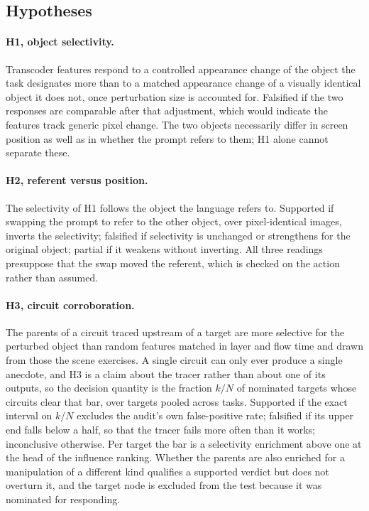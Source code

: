 \subsection{Hypotheses}
\label{sec:hypotheses}

\paragraph{H1, object selectivity.}
Transcoder features respond to a controlled appearance change of the object
the task designates more than to a matched appearance change of a visually
identical object it does not, once perturbation size is accounted for.
Falsified if the two responses are comparable after that adjustment, which
would indicate the features track generic pixel change. The two objects
necessarily differ in screen position as well as in whether the prompt refers
to them; H1 alone cannot separate these.

\paragraph{H2, referent versus position.}
The selectivity of H1 follows the object the language refers to. Supported if
swapping the prompt to refer to the other object, over pixel-identical images,
inverts the selectivity; falsified if selectivity is unchanged or strengthens
for the original object; partial if it weakens without inverting. All three
readings presuppose that the swap moved the referent, which is checked on the
action rather than assumed.

\paragraph{H3, circuit corroboration.}
The parents of a circuit traced upstream of a target are more selective for the
perturbed object than random features matched in layer and flow time and drawn
from those the scene exercises. A single circuit can only ever produce a single
anecdote, and H3 is a claim about the tracer rather than about one of its
outputs, so the decision quantity is the fraction $k/N$ of nominated targets
whose circuits clear that bar, over targets pooled across tasks. Supported if
the exact interval on $k/N$ excludes the audit's own false-positive rate;
falsified if its upper end falls below a half, so that the tracer fails more
often than it works; inconclusive otherwise. Per target the bar is a
selectivity enrichment above one at the head of the influence ranking. Whether
the parents are also enriched for a manipulation of a different kind qualifies
a supported verdict but does not overturn it, and the target node is excluded
from the test because it was nominated for responding.

